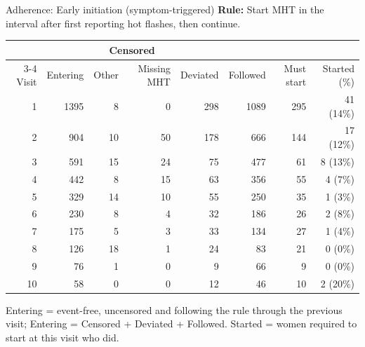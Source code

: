 \documentclass[aspectratio=169]{beamer}
\begin{document}
\begin{frame}{Adherence: Early initiation (symptom-triggered)}
\centering
{\small \textbf{Rule:} Start MHT in the interval after first reporting hot flashes, then continue.}\par\vspace{6pt}
{\scriptsize
\begin{tabular}{r r r r r r r r}
\toprule
 & & \multicolumn{2}{c}{Censored} & & & & \\
\cmidrule(lr){3-4}
Visit & Entering & Other & Missing MHT & Deviated & Followed & Must start & Started (\%) \\
\midrule
1 & 1395 & 8 & 0 & 298 & 1089 & 295 & 41 (14\%) \\
2 & 904 & 10 & 50 & 178 & 666 & 144 & 17 (12\%) \\
3 & 591 & 15 & 24 & 75 & 477 & 61 & 8 (13\%) \\
4 & 442 & 8 & 15 & 63 & 356 & 55 & 4 (7\%) \\
5 & 329 & 14 & 10 & 55 & 250 & 35 & 1 (3\%) \\
6 & 230 & 8 & 4 & 32 & 186 & 26 & 2 (8\%) \\
7 & 175 & 5 & 3 & 33 & 134 & 27 & 1 (4\%) \\
8 & 126 & 18 & 1 & 24 & 83 & 21 & 0 (0\%) \\
9 & 76 & 1 & 0 & 9 & 66 & 9 & 0 (0\%) \\
10 & 58 & 0 & 0 & 12 & 46 & 10 & 2 (20\%) \\
\bottomrule
\end{tabular}}
\par\vspace{6pt}
{\tiny Entering = event-free, uncensored and following the rule through the previous visit; Entering = Censored + Deviated + Followed. Started = women required to start at this visit who did.}
\end{frame}
\end{document}
